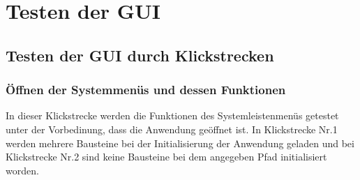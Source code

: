 \documentclass[parskip=full]{scrartcl}
\begin{document}
\clearpage
\section{Testen der GUI} \label{gui}


\subsection{Testen der GUI durch Klickstrecken}

\subsubsection{Öffnen der Systemmenüs und dessen Funktionen}

In dieser Klickstrecke werden die Funktionen des Systemleistenmenüs getestet unter der Vorbedinung, dass die Anwendung geöffnet ist. In Klickstrecke Nr.1 werden mehrere Bausteine bei der Initialisierung der Anwendung geladen und bei Klickstrecke Nr.2 sind keine Bausteine bei dem angegeben Pfad initialisiert worden. 
\end{document}
